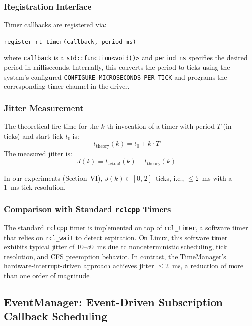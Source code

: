 \subsubsection{Registration Interface}

Timer callbacks are registered via:
\begin{center}
\texttt{register\_rt\_timer(callback, period\_ms)}
\end{center}
where \texttt{callback} is a \texttt{std::function<void()>} and \texttt{period\_ms} specifies the desired period in milliseconds.  Internally, this converts the period to ticks using the system's configured \texttt{CONFIGURE\_MICROSECONDS\_PER\_TICK} and programs the corresponding timer channel in the driver.

\subsubsection{Jitter Measurement}

The theoretical fire time for the $k$-th invocation of a timer with period $T$ (in ticks) and start tick $t_0$ is:
\begin{equation}
    t_{\text{theory}}(k) = t_0 + k \cdot T
\end{equation}
The measured jitter is:
\begin{equation}
    J(k) = t_{\text{actual}}(k) - t_{\text{theory}}(k)
\end{equation}

In our experiments (Section~VI), $J(k) \in [0,\, 2]$~ticks, i.e., $\leqslant 2$~ms with a 1~ms tick resolution.

\subsubsection{Comparison with Standard \texttt{rclcpp} Timers}

The standard \texttt{rclcpp} timer is implemented on top of \texttt{rcl\_timer}, a software timer that relies on \texttt{rcl\_wait} to detect expiration.  On Linux, this software timer exhibits typical jitter of $10$--$50$~ms due to nondeterministic scheduling, tick resolution, and CFS preemption behavior.  In contrast, the TimeManager's hardware-interrupt-driven approach achieves jitter $\leqslant 2$~ms, a reduction of more than one order of magnitude.

\subsection{EventManager: Event-Driven Subscription Callback Scheduling}

